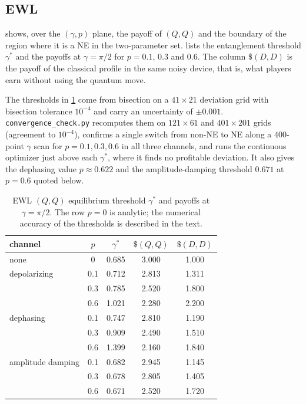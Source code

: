 \documentclass[11pt,a4paper]{article}
\begin{document}
\subsection{EWL}
 shows, over the $(\gamma,p)$ plane, the payoff of $(Q,Q)$ and the boundary of the region where it is a NE in the two-parameter set.  lists the entanglement threshold $\gamma^*$ and the payoffs at $\gamma=\pi/2$ for $p=0.1$, $0.3$ and $0.6$. The column $\$(D,D)$ is the payoff of the classical profile in the same noisy device, that is, what players earn without using the quantum move.

The thresholds in \cref{tab:ewl} come from bisection on a $41\times21$ deviation grid with bisection tolerance $10^{-4}$ and carry an uncertainty of $\pm0.001$. \texttt{convergence\_check.py} recomputes them on $121\times61$ and $401\times201$ grids (agreement to $10^{-4}$), confirms a single switch from non-NE to NE along a 400-point $\gamma$ scan for $p=0.1,0.3,0.6$ in all three channels, and runs the continuous optimizer just above each $\gamma^*$, where it finds no profitable deviation. It also gives the dephasing value $p\approx0.622$ and the amplitude-damping threshold $0.671$ at $p=0.6$ quoted below.
\begin{table}[htbp]\centering\small
\caption{EWL $(Q,Q)$ equilibrium threshold $\gamma^*$ and payoffs at $\gamma=\pi/2$. The row $p=0$ is analytic; the numerical accuracy of the thresholds is described in the text.}
\label{tab:ewl}
\begin{tabular}{lcccc}
\toprule
channel & $p$ & $\gamma^*$ & $\$(Q,Q)$ & $\$(D,D)$\\
\midrule
none & 0 & 0.685 & 3.000 & 1.000\\
\midrule
depolarizing & 0.1 & 0.712 & 2.813 & 1.311\\
 & 0.3 & 0.785 & 2.520 & 1.800\\
 & 0.6 & 1.021 & 2.280 & 2.200\\
\midrule
dephasing & 0.1 & 0.747 & 2.810 & 1.190\\
 & 0.3 & 0.909 & 2.490 & 1.510\\
 & 0.6 & 1.399 & 2.160 & 1.840\\
\midrule
amplitude damping & 0.1 & 0.682 & 2.945 & 1.145\\
 & 0.3 & 0.678 & 2.805 & 1.405\\
 & 0.6 & 0.671 & 2.520 & 1.720\\
\bottomrule
\end{tabular}
\end{table}
\end{document}
